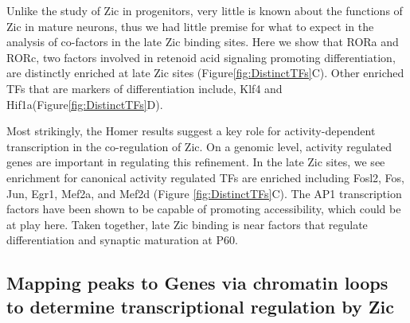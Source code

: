\documentclass[fleqn,10pt]{wlscirep}
\begin{document}
Unlike the study of Zic in progenitors, very little is known about the functions of Zic in mature neurons, thus we had little premise for what to expect in the analysis of co-factors in the late Zic binding sites.  Here we show that RORa and RORc, two factors involved in retenoid acid signaling promoting differentiation, are distinctly enriched at late Zic sites (Figure\ref{fig:DistinctTFs}C). Other enriched TFs that are markers of differentiation include, Klf4 and Hif1a\cite{}(Figure\ref{fig:DistinctTFs}D). 

Most strikingly, the Homer results suggest a key role for activity-dependent transcription in the co-regulation of Zic. On a genomic level, activity regulated genes are important in regulating this refinement. In the late Zic sites, we see enrichment for canonical activity regulated TFs are enriched  including Fosl2, Fos, Jun, Egr1, Mef2a, and Mef2d (Figure \ref{fig:DistinctTFs}C). The AP1 transcription factors have been shown to be capable of promoting accessibility, which could be at play here.  Taken together, late Zic binding is near factors that regulate differentiation and synaptic maturation at P60. 



\subsection*{Mapping peaks to Genes via chromatin loops to determine transcriptional regulation by Zic}
\end{document}
